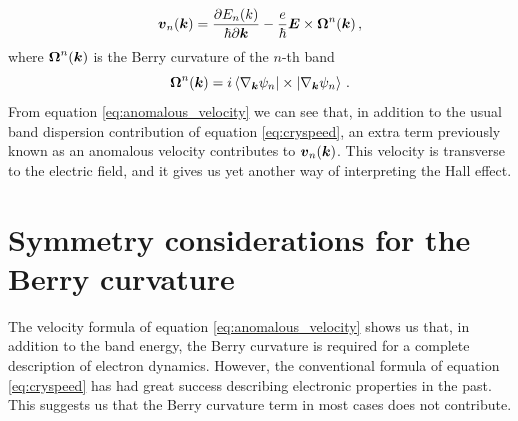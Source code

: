 \begin{equation}
    \boldsymbol{v}_n(\boldsymbol{k})=\frac{\partial E_n (k)}{\hbar\partial \boldsymbol{k}} -\frac e\hbar \boldsymbol{E}\times \boldsymbol{\Omega}^n(\boldsymbol{k})\,,
    \label{eq:anomalous_velocity}
\end{equation}
where $\boldsymbol{\Omega}^n(\boldsymbol{k})$ is the Berry curvature of the $n$-th band 
\begin{equation}
    \boldsymbol{\Omega}^n(\boldsymbol{k})=i\bra{\nabla_{\boldsymbol{k}}\psi_n}\times \ket{\nabla_{\boldsymbol{k}}\psi_n}  \,.    
\end{equation}
From equation \ref{eq:anomalous_velocity} we can see that, in addition to the usual band dispersion contribution of equation \ref{eq:cryspeed}, an extra term previously known as an anomalous velocity contributes to $\boldsymbol{v}_n(\boldsymbol{k})$. This velocity is transverse to the electric field, and it gives us yet another way of interpreting the Hall effect.













\section{Symmetry considerations for the Berry curvature}
\label{sec:berry-symm}
The velocity formula of equation \ref{eq:anomalous_velocity} shows us that, in addition to the band energy, the Berry curvature is required for a complete description of electron dynamics. However, the conventional formula of equation \ref{eq:cryspeed} has had great success describing electronic properties in the past. This suggests us that the Berry curvature term in most cases does not contribute.

